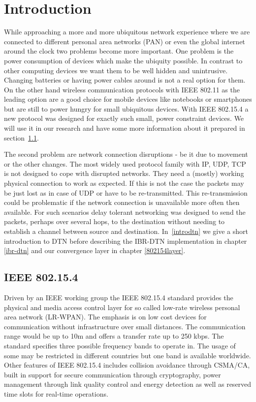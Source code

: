 \chapter{Introduction}
While approaching a more and more ubiquitous network experience where we are
connected to different personal area networks (PAN) or even the global internet
around the clock two problems become more important. One problem is the power
consumption of devices which make the ubiquity possible. In contrast to other
computing devices we want them to be well hidden and unintrusive. Changing
batteries or having power cables around is not a real option for them. On the
other hand wireless communication protocols with IEEE 802.11 \cite{ieee80211} as the
leading option are a good choice for mobile devices like notebooks or
smartphones but are still to power hungry for small ubiquitous devices.
With IEEE 802.15.4 \cite{ieee802154} a new protocol was designed for exactly such
small, power constraint devices. We will use it in our research and have some
more information about it prepared in section~\ref{intro802154}.

The second problem are network connection disruptions - be it due to movement or
the other changes. The most widely used protocol family with IP, UDP, TCP is not
designed to cope with disrupted networks. They need a (mostly) working physical connection
to work as expected. If this is not the case the packets may be just lost
as in case of UDP or have to be re-transmitted. This re-transmission could be
problematic if the network connection is unavailable more often then available.
For such scenarios delay tolerant networking was designed to send the
packets, perhaps over several hops, to the destination without needing to
establish a channel between source and destination. In~\ref{introdtn} we give a
short introduction to DTN before describing the IBR-DTN implementation in chapter
\ref{ibr-dtn} and our convergence layer in chapter \ref{802154layer}.

\section{IEEE 802.15.4}
\label{intro802154}
Driven by an IEEE working group the IEEE 802.15.4 standard provides the physical and
media access control layer for so called low-rate wireless personal area network
(LR-WPAN). The emphasis is on low cost devices for communication without
infrastructure over small distances. The communication range would be up to
10m and offers a transfer rate up to 250 kbps. The standard specifies
three possible frequency bands to operate in. The usage of some may be
restricted in different countries but one band is available worldwide. Other
features of IEEE 802.15.4 includes collision avoidance through CSMA/CA, built in
support for secure communication through cryptography, power management through
link quality control and energy detection as well as reserved time slots for
real-time operations.

